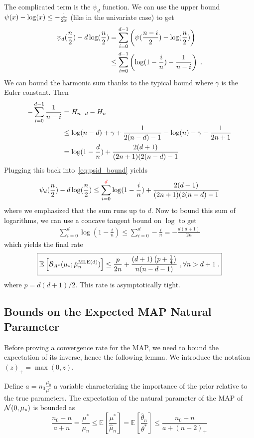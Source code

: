 \documentclass{article}
\newcommand*{\expect}[2][]{\ensuremath{\mathbb{E}_{#1} \left[ #2 \right] }} %
\newcommand{\logpart}{A}
\newcommand{\bregmanconj}{\cB_{\logpart^*}}
\newcommand{\nat}{\theta}
\newcommand{\MAPm}{\hat \mu_n}
\newcommand{\MAPt}{\hat \nat_n}
\begin{document}
The complicated term is the $\psi_d$ function.
We can use the upper bound $\psi(x) - \log(x) \leq - \inv{2x}$ (like in the univariate case) to get
\begin{align}
	\psi_d(\half[n]) - d \log(\half[n]) 
	&= \sum_{i=0}^{d-1} \paren{\psi ( \half[n - i]) - \log(\half[n]) } \\
	&\leq \sum_{i=0}^{d-1} \paren{\log(1 - \frac{i}{n}) - \frac{1}{n-i}} \; .
	\label{eq:psid_bound}
\end{align}
We can bound the harmonic sum thanks to the typical bound
where $\gamma$ is the Euler constant. Then
\begin{align}
	- \sum_{i=0}^{d-1} \frac{1}{n-i} 
	&= H_{n-d} - H_n \\
	&\leq \log(n-d) + \gamma + \inv{2(n-d) - 1} - \log(n) - \gamma - \inv{2n+1}\\
	&= \log(1-\frac{d}{n})  + \frac{2(d + 1)}{(2n+1)(2(n - d) - 1}
\end{align}
Plugging this back into~\eqref{eq:psid_bound} yields
\begin{align}
	\psi_d(\half[n]) - d \log(\half[n]) 
	\leq \sum_{i=0}^{\textcolor{red}{d}} \log(1 - \frac{i}{n})
	+ \frac{2(d + 1)}{(2n+1)(2(n - d) - 1} 
\end{align}
where we emphasized that the sum runs up to $d$.
Now to bound this sum of logarithms, we can use a concave tangent bound on $\log$ to get
\begin{align}
	\sum_{i=0}^{d} \log(1 - \frac{i}{n})
	\leq \sum_{i=0}^{d} - \frac{i}{n}
	 = -\frac{d(d+1)}{2n}
\end{align}
which yields the final rate
\begin{align}
 	\boxed{
 	\expect{\bregmanconj( \mu_*; \hat \mu_n^\text{MLE(d)})}
 	\leq \frac{p}{2n} + \frac{(d+1) \paren{p + \inv{4}}}{n (n - d -1)}
 	\ , \forall n >d+1 \;.
 	}
\end{align}
where $p = d(d+1)/2$.
This rate is asymptotically tight.

\subsection{Bounds on the Expected MAP Natural Parameter}
Before proving a convergence rate for the MAP, we need to bound the expectation of its inverse, hence the following lemma.
We introduce the notation $(z)_+ = \max(0,z)$.
\begin{lemma}
	Define $a=n_0 \frac{\mu_0}{\mu^*} $ a variable characterizing the importance of the prior relative to the true parameters.
	The expectation of the natural parameter of the MAP of $\cN(0,\mu_*)$ is bounded as
\begin{equation}
		\frac{n_0+n}{a+n}
		=\frac{\mu^*}{\mu_n}
		\leq \expect{\frac{\mu^*}{\MAPm}} 
		= \expect{\frac{\MAPt}{\nat^*}} 
		\leq
		\frac{n_0 +n}{a+(n-2)_+}
		\label{eq:lemma_nat_bound}
	\end{equation}
\end{lemma}
\end{document}
